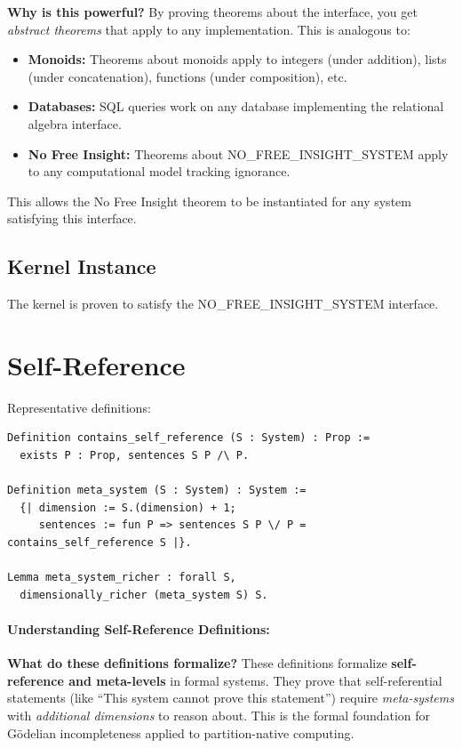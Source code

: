 \textbf{Why is this powerful?} By proving theorems about the interface, you get \textit{abstract theorems} that apply to any implementation. This is analogous to:
\begin{itemize}
    \item \textbf{Monoids:} Theorems about monoids apply to integers (under addition), lists (under concatenation), functions (under composition), etc.
    \item \textbf{Databases:} SQL queries work on any database implementing the relational algebra interface.
    \item \textbf{No Free Insight:} Theorems about NO\_FREE\_INSIGHT\_SYSTEM apply to any computational model tracking ignorance.
\end{itemize}


This allows the No Free Insight theorem to be instantiated for any system satisfying this interface.

\subsection{Kernel Instance}

The kernel is proven to satisfy the NO\_FREE\_INSIGHT\_SYSTEM interface.

\section{Self-Reference}

Representative definitions:
\begin{lstlisting}
Definition contains_self_reference (S : System) : Prop :=
  exists P : Prop, sentences S P /\ P.

Definition meta_system (S : System) : System :=
  {| dimension := S.(dimension) + 1;
     sentences := fun P => sentences S P \/ P = contains_self_reference S |}.

Lemma meta_system_richer : forall S, 
  dimensionally_richer (meta_system S) S.
\end{lstlisting}

\paragraph{Understanding Self-Reference Definitions:}

\textbf{What do these definitions formalize?} These definitions formalize \textbf{self-reference and meta-levels} in formal systems. They prove that self-referential statements (like ``This system cannot prove this statement'') require \textit{meta-systems} with \textit{additional dimensions} to reason about. This is the formal foundation for Gödelian incompleteness applied to partition-native computing.

